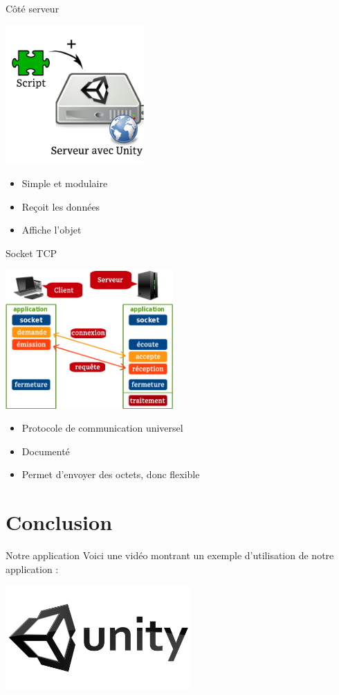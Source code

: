 \documentclass[a4paper,10pt]{beamer}
\begin{document}
	

	\begin{frame}{Côté serveur}
		\centerline{\includegraphics[height=150pt]{images/network/plugin.png}}
		\begin{itemize}	
			\item \pause Simple et modulaire \pause
			\item Reçoit les données \pause
			\item Affiche l'objet 
		\end{itemize}	
		
	\end{frame}
	
	
	\begin{frame}{Socket TCP}
		\centerline{\includegraphics[height=150pt]{images/network/tcp-socket6.png}}
			\begin{itemize}
				\item \pause Protocole de communication universel \pause
				\item Documenté \pause
				\item Permet d'envoyer des octets, donc flexible
			\end{itemize}
	\end{frame}
	
	\section{Conclusion}
	
	\begin{frame}{Notre application}
		Voici une vidéo montrant un exemple d'utilisation de notre application :
		
		\href{run:PresentationAppli.wmv}{\includegraphics[width=200pt]{images/techno/unity-logo.png}}
	\end{frame}
	
\end{document}
